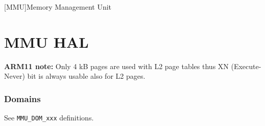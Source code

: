 [MMU]{Memory Management Unit}

\chapter{\acl{MMU} \acs{HAL}}




\textbf{ARM11 note:} Only 4 kB pages are used with L2 page tables thus
XN (Execute-Never) bit is always usable also for L2 pages.

\subsection{Domains}

See \verb+MMU_DOM_xxx+ definitions.

